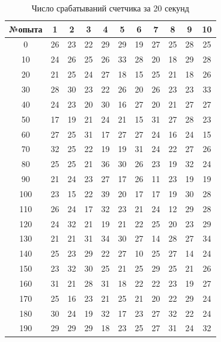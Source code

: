 \documentclass{article}
\begin{document}
\begin{table}[!h]
    \centering
    \begin{tabular}{|c|c|c|c|c|c|c|c|c|c|c|}
        \hline
         №опыта & 1 & 2 & 3 & 4 & 5 & 6 & 7 & 8 & 9 & 10 \\
         \hline
         0 & 26 & 23 & 22 & 29 & 29 & 19 & 27 & 25 & 28 & 25 \\
        10 & 24 & 26 & 25 & 26 & 33 & 28 & 20 & 18 & 29 & 28 \\
        20 & 21 & 25 & 24 & 27 & 18 & 15 & 25 & 21 & 18 & 26 \\
        30 & 28 & 30 & 23 & 22 & 26 & 20 & 26 & 23 & 23 & 33 \\
        40 & 24 & 23 & 20 & 30 & 16 & 27 & 20 & 21 & 27 & 27 \\
        50 & 17 & 19 & 21 & 24 & 21 & 15 & 31 & 27 & 28 & 23 \\
        60 & 27 & 25 & 31 & 17 & 27 & 27 & 24 & 16 & 24 & 15 \\
        70 & 32 & 25 & 22 & 19 & 19 & 31 & 24 & 22 & 27 & 26 \\
        80 & 25 & 25 & 21 & 36 & 30 & 26 & 23 & 19 & 32 & 24 \\
        90 & 21 & 24 & 23 & 27 & 17 & 26 & 11 & 23 & 19 & 19 \\
        100 & 23 & 15 & 22 & 39 & 20 & 17 & 17 & 19 & 30 & 28 \\
        110 & 26 & 24 & 17 & 32 & 23 & 21 & 24 & 12 & 29 & 28 \\
        120 & 24 & 32 & 21 & 19 & 21 & 22 & 25 & 20 & 23 & 29 \\
        130 & 21 & 21 & 31 & 34 & 30 & 27 & 14 & 28 & 27 & 34 \\
        140 & 25 & 23 & 29 & 22 & 27 & 10 & 25 & 27 & 14 & 24 \\
        150 & 23 & 32 & 30 & 25 & 21 & 25 & 29 & 25 & 21 & 26 \\
        160 & 31 & 21 & 28 & 31 & 18 & 22 & 22 & 23 & 19 & 27 \\
        170 & 25 & 16 & 23 & 21 & 25 & 21 & 20 & 22 & 29 & 24 \\
        180 & 30 & 24 & 19 & 32 & 17 & 23 & 27 & 32 & 22 & 24 \\
        190 & 29 & 29 & 29 & 18 & 23 & 25 & 27 & 31 & 24 & 32 \\
        \hline
    \end{tabular}
    \caption{Число срабатываний счетчика за 20 секунд}
\end{table}
\end{document}
